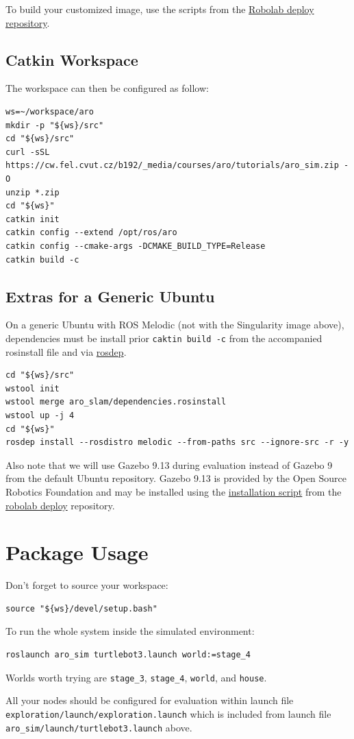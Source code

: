 \documentclass[a4paper]{article}
\newcommand{\file}[1]{\texttt{#1}}
\begin{document}
To build your customized image, use the scripts from the \href{https://gitlab.fel.cvut.cz/robolab/deploy}{Robolab deploy repository}.

\subsection{Catkin Workspace}

The workspace can then be configured as follow:
{
\small%
\begin{verbatim}
ws=~/workspace/aro
mkdir -p "${ws}/src"
cd "${ws}/src"
curl -sSL https://cw.fel.cvut.cz/b192/_media/courses/aro/tutorials/aro_sim.zip -O
unzip *.zip
cd "${ws}"
catkin init
catkin config --extend /opt/ros/aro
catkin config --cmake-args -DCMAKE_BUILD_TYPE=Release
catkin build -c
\end{verbatim}
}

\subsection{Extras for a Generic Ubuntu}

On a generic Ubuntu with ROS Melodic (not with the Singularity image above), dependencies must be install prior \file{caktin build -c} from the accompanied rosinstall file and via \href{http://wiki.ros.org/rosdep}{rosdep}.
{
\small
\begin{verbatim}
cd "${ws}/src"
wstool init
wstool merge aro_slam/dependencies.rosinstall
wstool up -j 4
cd "${ws}"
rosdep install --rosdistro melodic --from-paths src --ignore-src -r -y
\end{verbatim}
}

Also note that we will use Gazebo 9.13 during evaluation instead of Gazebo 9 from the default Ubuntu repository.
Gazebo 9.13 is provided by the Open Source Robotics Foundation and may be installed using the
\href{https://gitlab.fel.cvut.cz/robolab/deploy/-/blob/master/scripts/install_gazebo}{installation script}
from the
\href{https://gitlab.fel.cvut.cz/robolab/deploy}{robolab deploy}
repository.

\section{Package Usage}
Don't forget to source your workspace:
\begin{verbatim}
source "${ws}/devel/setup.bash"
\end{verbatim}
To run the whole system inside the simulated environment:
\begin{verbatim}
roslaunch aro_sim turtlebot3.launch world:=stage_4
\end{verbatim}
Worlds worth trying are \file{stage_3}, \file{stage_4}, \file{world}, and \file{house}.

All your nodes should be configured for evaluation within launch file\\
\file{exploration/launch/exploration.launch}
which is included from launch file
\file{aro_sim/launch/turtlebot3.launch}
above.


%
%
\end{document}
